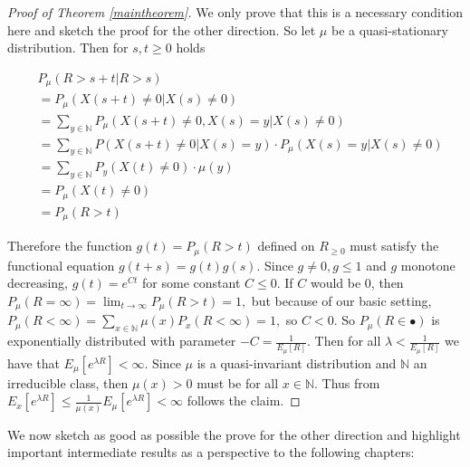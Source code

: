 \documentclass[12pt,a4paper]{scrartcl}
\numberwithin{equation}{section}
\newcommand{\N}{\mathbb{N}} %
\begin{document}
\begin{proof} [Proof of Theorem \ref{maintheorem}]
We only prove that this is a necessary condition here and sketch the proof for the other direction.
So let $ \mu $ be a quasi-stationary distribution. Then for $ s,t \geq 0 $ holds

\begin{align*}
& P_{\mu}\left(R > s+t | R > s \right) \\
&= P_{\mu}\left(X\left(s+t\right) \neq 0 | X\left(s\right) \neq 0 \right) \\
&= \sum_{y \in \N} P_{\mu}\left(X\left(s+t\right) \neq 0 , X\left(s\right) = y | X\left(s\right) \neq 0 \right) \\
&= \sum_{y \in \N} P\left(X\left(s+t\right) \neq 0 | X\left(s\right) = y\right) \cdot P_{\mu}\left(X\left(s\right) = y | X\left(s\right) \neq 0 \right) \\
&=\sum_{y \in \N} P_y \left(X\left(t\right) \neq 0 \right) \cdot \mu\left(y\right) \\
&= P_{\mu} \left(X\left(t\right) \neq 0 \right) \\
&= P_{\mu} \left(R > t\right)
\end{align*}

Therefore the function $g\left(t\right) = P_{\mu}\left(R > t\right)$ defined on $R_{\geq 0}$ must satisfy the functional equation $g\left(t+s\right) = g\left(t\right) g\left(s\right).$ Since $g \neq 0, g \leq 1$ and $g$ monotone decreasing, $g\left(t\right) = e^{Ct}$ for some constant $C \leq 0$. If $C$ would be $0$, then $P_{\mu}\left(R = \infty\right) = \lim_{t \to \infty} P_{\mu}\left(R > t\right) = 1,$ but because of our basic setting, $P_{\mu}\left(R < \infty\right) = \sum_{x \in \N} \mu\left(x\right) P_x\left(R < \infty\right) = 1,$ so $ C < 0.$
So $P_{\mu}\left(R \in \bullet\right)$ is exponentially distributed with parameter $-C = \frac{1}{E_{\mu} \left[R\right]}$. Then for all $ \lambda < \frac{1}{E_{\mu} \left[R\right]} $ we have that $ E_{\mu} \left[e^{\lambda R}\right] < \infty$. Since $\mu$ is a quasi-invariant distribution and $\N$ an irreducible class, then $ \mu\left(x\right) > 0 $ must be for all $ x \in \N$. Thus from $E_{x} \left[e^{\lambda R}\right] \leq \frac{1}{\mu\left(x\right)} E_{\mu} \left[e^{\lambda R}\right] < \infty $ follows the claim.

\end{proof}

We now sketch as good as possible the prove for the other direction and highlight important intermediate results as a perspective to the following chapters:
\end{document}

